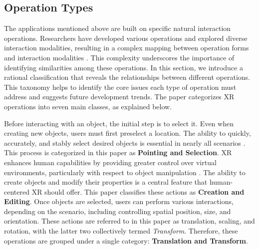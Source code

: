 \documentclass[review]{fcs}
\begin{document}


















\subsection{Operation Types}
\label{operationtypes}
The applications mentioned above are built on specific natural interaction operations. Researchers have developed various operations and explored diverse interaction modalities, resulting in a complex mapping between operation forms and interaction modalities \cite{DBLP:conf/ismar/HertelKSBSS21}. This complexity underscores the importance of identifying similarities among these operations. In this section, we introduce a rational classification that reveals the relationships between different operations. This taxonomy helps to identify the core issues each type of operation must address and suggests future development trends. The paper categorizes XR operations into seven main classes, as explained below.

Before interacting with an object, the initial step is to select it. Even when creating new objects, users must first preselect a location. The ability to quickly, accurately, and stably select desired objects is essential in nearly all scenarios \cite{marquardt2024selection}. This process is categorized in this paper as \textbf{Pointing and Selection}.
XR enhances human capabilities by providing greater control over virtual environments, particularly with respect to object manipulation \cite{DBLP:conf/chi/WangLZ24}. The ability to create objects and modify their properties is a central feature that human-centered XR should offer. This paper classifies these actions as \textbf{Creation and Editing}.
Once objects are selected, users can perform various interactions, depending on the scenario, including controlling spatial position, size, and orientation. These actions are referred to in this paper as translation, scaling, and rotation, with the latter two collectively termed \textit{Transform}. Therefore, these operations are grouped under a single category: \textbf{Translation and Transform}.
\end{document}
